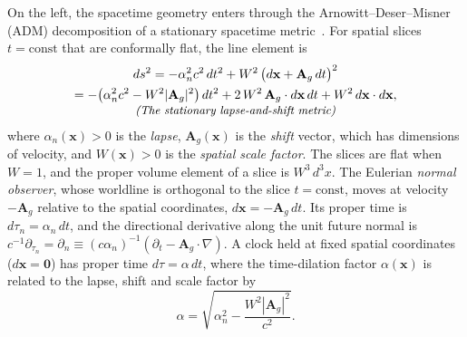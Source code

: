 \documentclass[aps,prd,onecolumn,tightenlines,nofootinbib,notitlepage,11pt,floatfix]{revtex4-2}
\theoremstyle{indentedtheorem}
\begin{document}
On the left, the spacetime geometry enters through the Arnowitt--Deser--Misner (ADM) decomposition of a stationary spacetime metric~\citep{Arnowitt2008Dynamics,MTW1973Gravitation,Baumgarte2003Numerical}. For spatial slices $t=\text{const}$ that are conformally flat, the line element is
\begin{equation}
    \begin{gathered}
    ds^2 = -\alpha_n^2c^2\,dt^2 + W^2\,\big(d\mathbf{x}+\mathbf{A}_g\,dt\big)^2 \\
         = -\big(\alpha_n^2c^2 - W^2|\mathbf{A}_g|^2\big)\,dt^2 + 2\,W^2\,\mathbf{A}_g\cdot d\mathbf{x}\,dt + W^2\,d\mathbf{x}\cdot d\mathbf{x} , \\[-3pt]
    \text{\small\itshape (The stationary lapse-and-shift metric)}
    \end{gathered}
    \label{eq:conformal_metric}
\end{equation}
where $\alpha_n(\mathbf{x})>0$ is the \emph{lapse}, $\mathbf{A}_g(\mathbf{x})$ is the \emph{shift} vector, which has dimensions of velocity, and $W(\mathbf{x})>0$ is the \emph{spatial scale factor}. The slices are flat when $W=1$, and the proper volume element of a slice is $W^3\,d^3x$. The Eulerian \emph{normal observer}, whose worldline is orthogonal to the slice $t=\text{const}$, moves at velocity $-\mathbf{A}_g$ relative to the spatial coordinates, $d\mathbf{x}=-\mathbf{A}_g\,dt$. Its proper time is $d\tau_n = \alpha_n\,dt$, and the directional derivative along the unit future normal is $c^{-1}\partial_{\tau_n} = \partial_n \equiv (c\alpha_n)^{-1}(\partial_t - \mathbf{A}_g\cdot\nabla)$. A clock held at fixed spatial coordinates ($d\mathbf{x}=\mathbf{0}$) has proper time $d\tau = \alpha\,dt$, where the time-dilation factor $\alpha(\mathbf{x})$ is related to the lapse, shift and scale factor by
\begin{equation}
    \alpha = \sqrt{\alpha_n^2 - \frac{W^2|\mathbf{A}_g|^2}{c^2}} .
    \label{eq:alpha_lapse_shift}
\end{equation}
\end{document}
